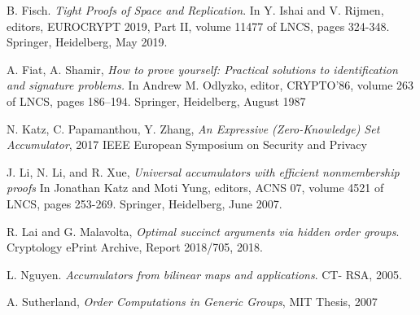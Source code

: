 \documentclass[11pt, lettersize, notitlepage, leqno, footskip=0.6cm]{article}
\newcommand{\noin}{\noindent}
\numberwithin{equation}{section}
\begin{document}
\noin [Fis18] B. Fisch. \textit{Tight Proofs of Space and Replication}. In Y. Ishai and V. Rijmen, editors, EUROCRYPT 2019, Part II, volume 11477 of LNCS, pages 324-348. Springer, Heidelberg, May 2019.

\noindent [FS87] A. Fiat, A. Shamir, \textit{How to prove yourself: Practical solutions to identification and signature problems.} In Andrew M. Odlyzko, editor, CRYPTO’86, volume 263 of LNCS, pages 186–194. Springer, Heidelberg, August 1987\vspace{0.1cm}

\noin [KPZ17] N. Katz, C. Papamanthou, Y. Zhang, \textit{An Expressive (Zero-Knowledge) Set Accumulator}, 2017 IEEE European Symposium on Security and Privacy


\noin [LLX07] J. Li, N. Li, and R. Xue,  \textit{Universal accumulators with efficient nonmembership proofs} In Jonathan Katz and Moti Yung, editors, ACNS 07, volume 4521 of LNCS, pages 253-269. Springer, Heidelberg, June 2007.

\noin [LM18] R. Lai and G. Malavolta,  \textit{Optimal succinct arguments
via hidden order groups}. Cryptology ePrint Archive, Report 2018/705,
2018.

\noin [Ngu05] L. Nguyen. \textit{Accumulators from bilinear maps and applications}. CT-
RSA, 2005. \vspace{0.1cm}

\noindent [Sut07] A. Sutherland, \textit{Order Computations in Generic Groups}, MIT Thesis, 2007 \vspace{0.1cm}
\end{document}
